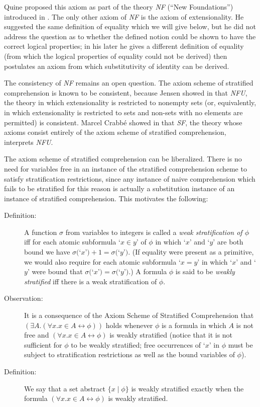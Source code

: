 \documentclass{article}
\begin{document}
Quine proposed this axiom as part of the theory {\em NF\/} (``New
Foundations'') introduced in \cite{nf}.  The only other axiom of {\em
NF\/} is the axiom of extensionality.  He suggested the same
definition of equality which we will give below, but he did not
address the question as to whether the defined notion could be shown
to have the correct logical properties; in his later \cite{ml} he
gives a different definition of equality (from which the logical
properties of equality could not be derived) then postulates an axiom
from which substitutivity of identity can be derived.

The consistency of {\em NF\/} remains an open question.  The axiom
scheme of stratified comprehension is known to be consistent, because
Jensen showed in \cite{nfu} that {\em NFU\/}, the theory in which
extensionality is restricted to nonempty sets (or, equivalently, in
which extensionality is restricted to sets and non-sets with no
elements are permitted) is consistent.  Marcel Crabb\'e showed in
\cite{sf} that {\em SF\/}, the theory whose axioms consist entirely of
the axiom scheme of stratified comprehension, interprets {\em NFU\/}.

The axiom scheme of stratified comprehension can be liberalized.
There is no need for variables free in an instance of the stratified
comprehension scheme to satisfy stratification restrictions, since any
instance of naive comprehension which fails to be stratified for this
reason is actually a substitution instance of an instance of
stratified comprehension.  This motivates the following:

\begin{description}

\item[Definition:]  A function $\sigma$ from variables to integers is called a {\em
weak stratification of $\phi$\/} iff for each atomic subformula `$x
\in y$' of $\phi$ in which `$x$' and `$y$' are both bound we have
$\sigma($`$x$'$)+1 = \sigma($`$y$'$)$.  (If equality were present as a
primitive, we would also require for each atomic subformula `$x = y$'
in which `$x$' and `$y$' were bound that $\sigma($`$x$'$) =
\sigma($`$y$'$)$.) A formula $\phi$ is said to be {\em weakly stratified\/}
iff there is a weak stratification of $\phi$.

\item[Observation:]  
It is a consequence of the Axiom Scheme of Stratified Comprehension
that $(\exists A.(\forall x.x \in A \leftrightarrow \phi))$ holds
whenever $\phi$ is a formula in which $A$ is not free and $(\forall
x.x \in A \leftrightarrow \phi)$ is weakly stratified (notice that it
is not sufficient for $\phi$ to be weakly stratified; free occurrences
of `$x$' in $\phi$ must be subject to stratification restrictions as
well as the bound variables of $\phi$).

\item[Definition:]  We say that a set abstract $\{x \mid \phi\}$ is weakly stratified
exactly when the formula $(\forall x.x \in A \leftrightarrow \phi)$ is
weakly stratified.

\end{description}
\end{document}
